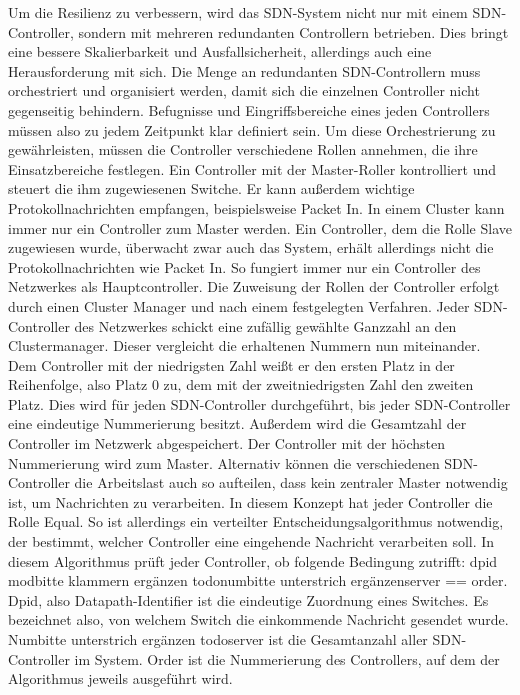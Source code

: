 Um die Resilienz zu verbessern, wird das SDN-System nicht nur mit einem SDN-Controller, sondern mit mehreren redundanten Controllern betrieben. Dies bringt eine bessere Skalierbarkeit und Ausfallsicherheit, 
allerdings auch eine Herausforderung mit sich. Die Menge an redundanten SDN-Controllern muss orchestriert und organisiert werden, damit sich die einzelnen Controller nicht gegenseitig behindern. 
Befugnisse und Eingriffsbereiche eines jeden Controllers müssen also zu jedem Zeitpunkt klar definiert sein. Um diese Orchestrierung zu gewährleisten, müssen die Controller verschiedene Rollen annehmen, 
die ihre Einsatzbereiche festlegen. Ein Controller mit der Master-Roller kontrolliert und steuert die ihm zugewiesenen Switche. Er kann außerdem wichtige Protokollnachrichten empfangen, beispielsweise Packet In. 
In einem Cluster kann immer nur ein Controller zum Master werden. Ein Controller, dem die Rolle Slave zugewiesen wurde, überwacht zwar auch das System, erhält allerdings nicht die Protokollnachrichten wie Packet In. 
So fungiert immer nur ein Controller des Netzwerkes als Hauptcontroller. Die Zuweisung der Rollen der Controller erfolgt durch einen Cluster Manager und nach einem festgelegten Verfahren. 
Jeder SDN-Controller des Netzwerkes schickt eine zufällig gewählte Ganzzahl an den Clustermanager. Dieser vergleicht die erhaltenen Nummern nun miteinander. 
Dem Controller mit der niedrigsten Zahl weißt er den ersten Platz in der Reihenfolge, also Platz 0 zu, dem mit der zweitniedrigsten Zahl den zweiten Platz. Dies wird für jeden SDN-Controller durchgeführt, 
bis jeder SDN-Controller eine eindeutige Nummerierung besitzt. Außerdem wird die Gesamtzahl der Controller im Netzwerk abgespeichert. Der Controller mit der höchsten Nummerierung wird zum Master. 
Alternativ können die verschiedenen SDN-Controller die Arbeitslast auch so aufteilen, dass kein zentraler Master notwendig ist, um Nachrichten zu verarbeiten. In diesem Konzept hat jeder Controller die Rolle Equal. 
So ist allerdings ein verteilter Entscheidungsalgorithmus notwendig, der bestimmt, welcher Controller eine eingehende Nachricht verarbeiten soll. In diesem Algorithmus prüft jeder Controller, ob folgende Bedingung zutrifft: 
dpid modbitte klammern ergänzen todonumbitte unterstrich ergänzenserver == order. Dpid, also Datapath-Identifier ist die eindeutige Zuordnung eines Switches. Es bezeichnet also, von welchem Switch die einkommende Nachricht gesendet wurde. 
Numbitte unterstrich ergänzen todoserver ist die Gesamtanzahl aller SDN-Controller im System. Order ist die Nummerierung des Controllers, auf dem der Algorithmus jeweils ausgeführt wird. 
